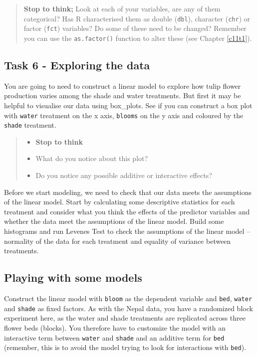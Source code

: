 \documentclass[
]{book}
\providecommand{\tightlist}{%
  \setlength{\itemsep}{0pt}\setlength{\parskip}{0pt}}
\begin{document}
\begin{quote}
\textbf{Stop to think;}
Look at each of your variables, are any of them categorical? Has R characterised them as double (\texttt{dbl}), character (\texttt{chr}) or factor (\texttt{fct}) variables?
Do some of these need to be changed? Remember you can use the \texttt{as.factor()} function to alter these (see Chapter \ref{c11t1}).
\end{quote}

\subsection{Task 6 - Exploring the data}\label{task-6---exploring-the-data}

You are going to need to construct a linear model to explore how tulip flower production varies among the shade and water treatments. But first it may be helpful to visualise our data using box\_plots. See if you can construct a box plot with \texttt{water} treatment on the x axis, \texttt{blooms} on the y axis and coloured by the \texttt{shade} treatment.

\begin{quote}
\begin{itemize}
\tightlist
\item
  \textbf{Stop to think}
\item
  What do you notice about this plot?
\item
  Do you notice any possible additive or interactive effects?
\end{itemize}
\end{quote}

Before we start modeling, we need to check that our data meets the assumptions of the linear model. Start by calculating some descriptive statistics for each treatment and consider what you think the effects of the predictor variables and whether the data meet the assumptions of the linear model. Build some histograms and run Levenes Test to check the assumptions of the linear model -- normality of the data for each treatment and equality of variance between treatments.

\subsection{Playing with some models}\label{playing-with-some-models}

Construct the linear model with \texttt{bloom} as the dependent variable and \texttt{bed}, \texttt{water} and \texttt{shade} as fixed factors. As with the Nepal data, you have a randomized block experiment here, as the water and shade treatments are replicated across three flower beds (blocks). You therefore have to customize the model with an interactive term between \texttt{water} and \texttt{shade} and an additive term for \texttt{bed} (remember, this is to avoid the model trying to look for interactions with \texttt{bed}).
\end{document}
